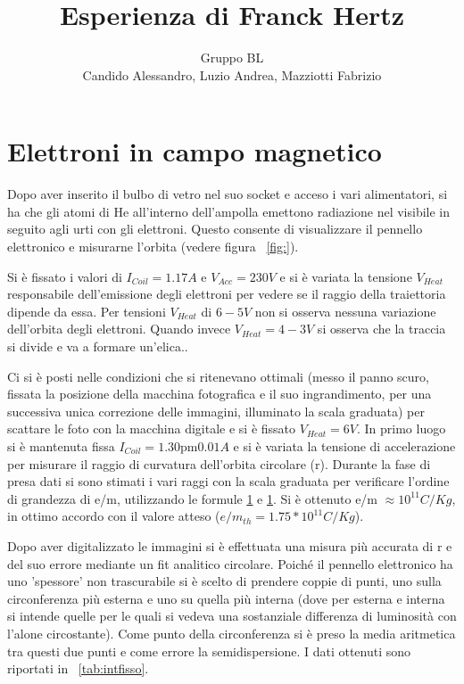 \documentclass[10pt,a4paper]{article}
\title{Esperienza di Franck Hertz}
\author{Gruppo BL \\ Candido Alessandro, Luzio Andrea, Mazziotti Fabrizio}
\begin{document}
\maketitle

\section{Elettroni in campo magnetico}
Dopo aver inserito il bulbo di vetro nel suo socket e acceso i vari alimentatori, si ha che gli atomi di He all'interno dell'ampolla emettono radiazione nel visibile in seguito agli urti con gli elettroni. Questo consente di visualizzare il pennello elettronico e misurarne l'orbita (vedere figura \figurename{~\ref{fig:}}).

Si è fissato i valori di $I_{Coil} = \unit{1.17}{A}$ e $V_{Acc} = \unit{230}{V}$ e si è variata la tensione $V_{Heat}$ responsabile dell'emissione degli elettroni per vedere se il raggio della traiettoria dipende da essa.
Per tensioni $V_{Heat}$ di $\unit{6-5}{V}$ non si osserva nessuna variazione dell'orbita degli elettroni. Quando invece $V_{Heat} = \unit{4-3}{V}$ si osserva che la traccia si divide e va a formare un'elica..


Ci si è posti nelle condizioni che si ritenevano ottimali (messo il panno scuro, fissata la posizione della macchina fotografica e il suo ingrandimento, per una successiva unica correzione delle immagini, illuminato la scala graduata) per scattare le foto con la macchina digitale e si è fissato $V_{Heat} = \unit{6}{V}$. In primo luogo si è mantenuta fissa $I_{Coil} = \unit{1.30 \pm 0.01}{A}$
 e si è variata la tensione di accelerazione per misurare il raggio di curvatura dell'orbita circolare (r). Durante la fase di presa dati si sono stimati i vari raggi con la scala graduata per verificare l'ordine di grandezza di e/m, utilizzando le formule \ref{} e \ref{}. Si è ottenuto e/m $\approx \unit{10^{11}}{C/Kg}$, in ottimo accordo con il valore atteso ($e/m_{th} = \unit{1.75*10^{11}}{C/Kg}$).

Dopo aver digitalizzato le immagini si è effettuata una misura più accurata di r e del suo errore mediante un fit analitico circolare. Poiché il pennello elettronico ha uno 'spessore' non trascurabile si è scelto di prendere coppie di punti, uno sulla circonferenza più esterna e uno su quella più interna (dove per esterna e interna si intende quelle per le quali si vedeva una sostanziale differenza di luminosità con l'alone circostante). Come punto della circonferenza si è preso la media aritmetica tra questi due punti e come errore la semidispersione. I dati ottenuti sono riportati in \tablename{~\ref{tab:intfisso}}.
\end{document}
